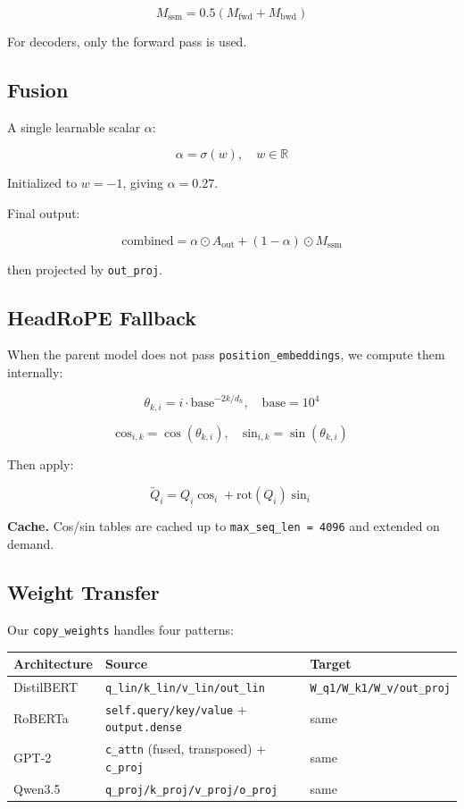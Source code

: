 \[
M_\text{ssm} = 0.5 (M_\text{fwd} + M_\text{bwd})
\tag{4.9}
\]

For decoders, only the forward pass is used.

\subsection{Fusion}

A single learnable scalar $\alpha$:

\[
\alpha = \sigma(w), \quad w \in \mathbb{R}
\tag{4.10}
\]

Initialized to $w = -1$, giving $\alpha = 0.27$.

Final output:

\[
\text{combined} = \alpha \odot A_\text{out} + (1 - \alpha) \odot M_\text{ssm}
\tag{4.11}
\]

then projected by \texttt{out\_proj}.

\subsection{HeadRoPE Fallback}

When the parent model does not pass \texttt{position\_embeddings}, we compute them 
internally:

\[
\theta_{k, i} = i \cdot \text{base}^{-2k/d_h}, \quad \text{base} = 10^4
\tag{4.12}
\]

\[
\text{cos}_{i, k} = \cos(\theta_{k, i}), \quad \text{sin}_{i, k} = \sin(\theta_{k, i})
\tag{4.13}
\]

Then apply:

\[
\tilde{Q}_i = Q_i \cos_i + \text{rot}(Q_i) \sin_i
\tag{4.14}
\]

\textbf{Cache.} Cos/sin tables are cached up to \texttt{max\_seq\_len = 4096} and extended 
on demand.

\subsection{Weight Transfer}

Our \texttt{copy\_weights} handles four patterns:

\begin{table}[H]
\centering
\small
\begin{tabular}{lll}
\toprule
\textbf{Architecture} & \textbf{Source} & \textbf{Target} \\
\midrule
DistilBERT & \texttt{q\_lin/k\_lin/v\_lin/out\_lin} & \texttt{W\_q1/W\_k1/W\_v/out\_proj} \\
RoBERTa & \texttt{self.query/key/value} + \texttt{output.dense} & same \\
GPT-2 & \texttt{c\_attn} (fused, transposed) + \texttt{c\_proj} & same \\
Qwen3.5 & \texttt{q\_proj/k\_proj/v\_proj/o\_proj} & same \\
\bottomrule
\end{tabular}
\end{table}

